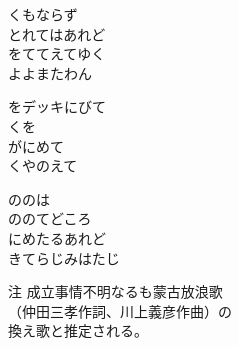 \documentclass[10pt,b5j]{tarticle} %
\begin{document}
\begin{enumerate} %
    \begin{minipage}[c]{\blocksize}
    
        \vspace{\linespace}
        \item
        くもならず\\
        とれてはあれど\\
        をててえてゆく\\
        よよまたわん

	\end{minipage}
	\begin{minipage}[c]{\blocksize}

        \vspace{\linespace}
        \item
        をデッキにびて\\
        くを\\
        がにめて\\
        くやのえて
        
	\end{minipage}
	\begin{minipage}[c]{\blocksize}

        \vspace{\linespace}
        \item
        ののは\\
        ののてどころ\\
        にめたるあれど\\
        きてらじみはたじ
    
    \end{minipage}
\end{enumerate} %
\begin{flushright}
        注 成立事情不明なるも蒙古放浪歌\\
        （仲田三孝作詞、川上義彦作曲）の\\
        換え歌と推定される。
\end{flushright}
\end{document}
